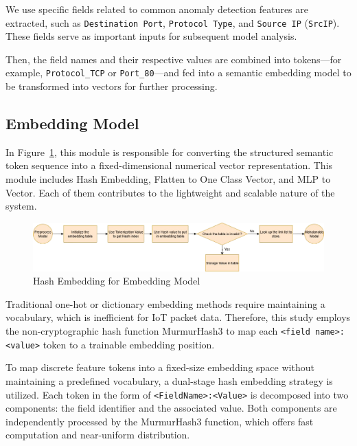 \begin{ZhChapter}
    We use specific fields related to common anomaly detection features are extracted, such as \texttt{Destination Port}, \texttt{Protocol Type}, and \texttt{Source IP} (\texttt{SrcIP}). These fields serve as important inputs for subsequent model analysis.

    Then, the field names and their respective values are combined into tokens—for example, \texttt{Protocol\_TCP} or \texttt{Port\_80}—and fed into a semantic embedding model to be transformed into vectors for further processing.




    \subsection{Embedding Model}
    In Figure~\ref{fig:hashembeddingflow}, this module is responsible for converting the structured semantic token sequence into a fixed-dimensional numerical vector representation. This module includes Hash Embedding, Flatten to One Class Vector, and MLP to Vector. Each of them contributes to the lightweight and scalable nature of the system.

    \begin{figure}[htbp]
        \centering
        \includegraphics[width = 1\textwidth]{image/hashembedding.jpg}
        \caption{Hash Embedding for Embedding Model}
        \label{fig:hashembeddingflow}
    \end{figure}

    Traditional one-hot or dictionary embedding methods require maintaining a vocabulary, which is inefficient for IoT packet data. Therefore, this study employs the non-cryptographic hash function MurmurHash3 to map each \texttt{<field name>:<value>} token to a trainable embedding position.

    To map discrete feature tokens into a fixed-size embedding space without maintaining a predefined vocabulary, a dual-stage hash embedding strategy is utilized. Each token in the form of \texttt{<FieldName>:<Value>} is decomposed into two components: the field identifier and the associated value. Both components are independently processed by the MurmurHash3 function, which offers fast computation and near-uniform distribution.


\end{ZhChapter}
